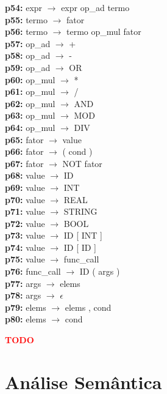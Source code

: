 \documentclass[12pt,a4paper]{report}
\begin{document}
\begin{tabbing}
\textbf{p54:} \> expr \(\to\) expr op\_ad termo \\
\textbf{p55:} \> termo \(\to\) fator \\
\textbf{p56:} \> termo \(\to\) termo op\_mul fator \\
\textbf{p57:} \> op\_ad \(\to\) + \\
\textbf{p58:} \> op\_ad \(\to\) - \\
\textbf{p59:} \> op\_ad \(\to\) OR \\
\textbf{p60:} \> op\_mul \(\to\) * \\
\textbf{p61:} \> op\_mul \(\to\) / \\
\textbf{p62:} \> op\_mul \(\to\) AND \\
\textbf{p63:} \> op\_mul \(\to\) MOD \\
\textbf{p64:} \> op\_mul \(\to\) DIV \\
\textbf{p65:} \> fator \(\to\) value \\
\textbf{p66:} \> fator \(\to\) ( cond ) \\
\textbf{p67:} \> fator \(\to\) NOT fator \\
\textbf{p68:} \> value \(\to\) ID \\
\textbf{p69:} \> value \(\to\) INT \\
\textbf{p70:} \> value \(\to\) REAL \\
\textbf{p71:} \> value \(\to\) STRING \\
\textbf{p72:} \> value \(\to\) BOOL \\
\textbf{p73:} \> value \(\to\) ID [ INT ] \\
\textbf{p74:} \> value \(\to\) ID [ ID ] \\
\textbf{p75:} \> value \(\to\) func\_call \\
\textbf{p76:} \> func\_call \(\to\) ID ( args ) \\
\textbf{p77:} \> args \(\to\) elems \\
\textbf{p78:} \> args \(\to\) \(\epsilon\) \\
\textbf{p79:} \> elems \(\to\) elems , cond \\
\textbf{p80:} \> elems \(\to\) cond \\
\end{tabbing}

\textcolor{red}{\textbf{TODO}}

\chapter{Análise Semântica}
\end{document}
